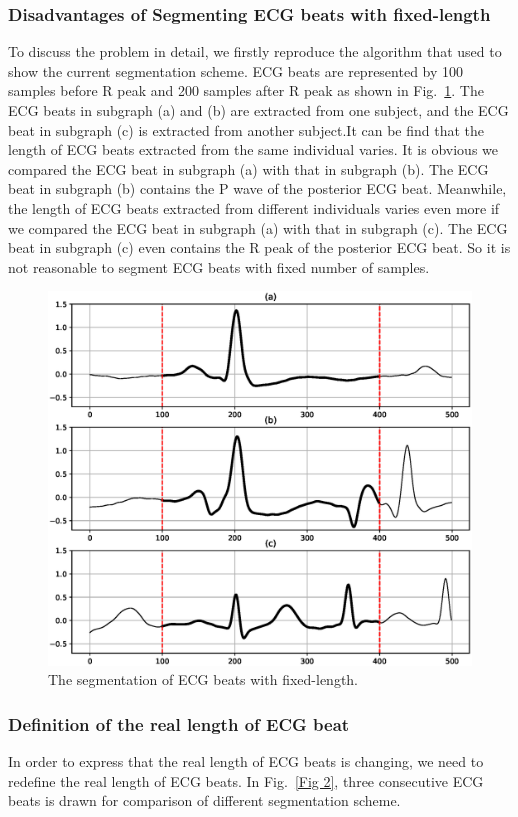 \documentclass[wcp]{jmlr}
\begin{document}
\subsubsection{Disadvantages of Segmenting ECG beats with fixed-length}
To discuss the problem in detail, we firstly reproduce the algorithm that \cite{ye2012combining} used to show the current segmentation scheme. ECG beats are represented by 100 samples before R peak and 200 samples after R peak as shown in Fig.~\ref{Fig 1}. The ECG beats in subgraph (a) and (b) are extracted from one subject, and the ECG beat in subgraph (c) is extracted from another subject.It can be find that the length of ECG beats extracted from the same individual varies. It is obvious we compared the ECG beat in subgraph (a) with that in subgraph (b). The ECG beat in subgraph (b) contains the P wave of the posterior ECG beat. Meanwhile, the length of ECG beats extracted from different individuals varies even more if we compared the ECG beat in subgraph (a) with that in subgraph (c). The ECG beat in subgraph (c) even contains the R peak of the posterior ECG beat. So it is not reasonable to segment ECG beats with fixed number of samples.
\noindent
\begin{figure}[t]
\centering
\includegraphics[scale=0.5]{frequency.eps}
\caption{The segmentation of ECG beats with fixed-length.}
\label{Fig 1}
\end{figure}
\subsubsection{Definition of the real length of ECG beat}
In order to express that the real length of ECG beats is changing, we need to redefine the real length of ECG beats. In Fig.~\ref{Fig 2}, three consecutive ECG beats is drawn for comparison of different segmentation scheme. 
\end{document}
